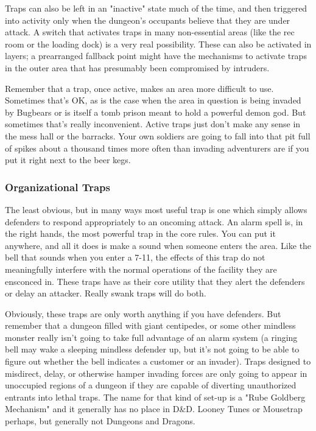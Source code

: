 Traps can also be left in an "inactive" state much of the time, and then triggered into activity only when the dungeon's occupants believe that they are under attack. A switch that activates traps in many non-essential areas (like the rec room or the loading dock) is a very real possibility. These can also be activated in layers; a prearranged fallback point might have the mechanisms to activate traps in the outer area that has presumably been compromised by intruders.

Remember that a trap, once active, makes an area more difficult to use. Sometimes that's OK, as is the case when the area in question is being invaded by Bugbears or is itself a tomb prison meant to hold a powerful demon god. But sometimes that's really inconvenient. Active traps just don't make any sense in the mess hall or the barracks. Your own soldiers are going to fall into that pit full of spikes about a thousand times more often than invading adventurers are if you put it right next to the beer kegs.

\subsubsection{Organizational Traps}

The least obvious, but in many ways most useful trap is one which simply allows defenders to respond appropriately to an oncoming attack. An alarm spell is, in the right hands, the most powerful trap in the core rules. You can put it anywhere, and all it does is make a sound when someone enters the area. Like the bell that sounds when you enter a 7-11, the effects of this trap do not meaningfully interfere with the normal operations of the facility they are ensconced in. These traps have as their core utility that they alert the defenders or delay an attacker. Really swank traps will do both.

Obviously, these traps are only worth anything if you have defenders. But remember that a dungeon filled with giant centipedes, or some other mindless monster really isn't going to take full advantage of an alarm system (a ringing bell may wake a sleeping mindless defender up, but it's not going to be able to figure out whether the bell indicates a customer or an invader). Traps designed to misdirect, delay, or otherwise hamper invading forces are only going to appear in unoccupied regions of a dungeon if they are capable of diverting unauthorized entrants into lethal traps. The name for that kind of set-up is a "Rube Goldberg Mechanism" and it generally has no place in D\&D. Looney Tunes or Mousetrap perhaps, but generally not Dungeons and Dragons.

